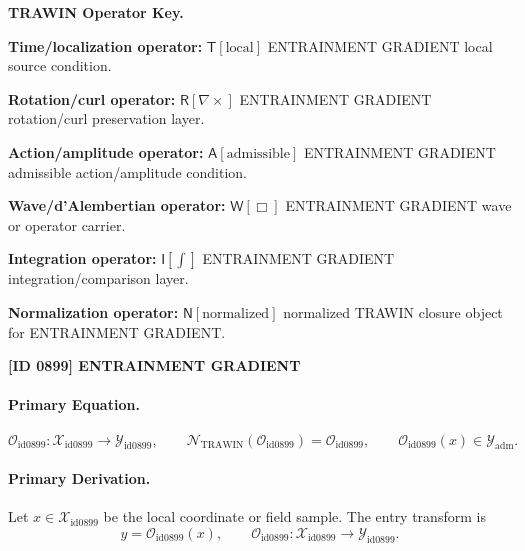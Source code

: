 \par\vspace{0.45\baselineskip}
\noindent\begin{minipage}[t]{\linewidth}
\begingroup
\small
\raggedright
\textbf{TRAWIN Operator Key.}\par
\noindent\textbf{Time/localization operator:} $\mathsf{T}\!\left[\mathrm{local}\right]$ ENTRAINMENT GRADIENT local source condition.\par
\noindent\textbf{Rotation/curl operator:} $\mathsf{R}\!\left[\nabla\times\right]$ ENTRAINMENT GRADIENT rotation/curl preservation layer.\par
\noindent\textbf{Action/amplitude operator:} $\mathsf{A}\!\left[\mathrm{admissible}\right]$ ENTRAINMENT GRADIENT admissible action/amplitude condition.\par
\noindent\textbf{Wave/d'Alembertian operator:} $\mathsf{W}\!\left[\Box\right]$ ENTRAINMENT GRADIENT wave or operator carrier.\par
\noindent\textbf{Integration operator:} $\mathsf{I}\!\left[\int\right]$ ENTRAINMENT GRADIENT integration/comparison layer.\par
\noindent\textbf{Normalization operator:} $\mathsf{N}\!\left[\mathrm{normalized}\right]$ normalized TRAWIN closure object for ENTRAINMENT GRADIENT.\par
\endgroup
\end{minipage}

\clearpage
\noindent\textbf{[ID 0899] ENTRAINMENT GRADIENT}\par
\vspace{0.35em}
\paragraph{Primary Equation.}
\[
\mathcal{O}_{\mathrm{id0899}}:\mathcal{X}_{\mathrm{id0899}}\longrightarrow \mathcal{Y}_{\mathrm{id0899}},\qquad
\mathcal{N}_{\mathrm{TRAWIN}}(\mathcal{O}_{\mathrm{id0899}})=\mathcal{O}_{\mathrm{id0899}},\qquad
\mathcal{O}_{\mathrm{id0899}}(x)\in\mathcal{Y}_{\mathrm{adm}}.
\]

\paragraph{Primary Derivation.} Let $x\in \mathcal{X}_{\mathrm{id0899}}$ be the local coordinate or field sample.  The entry transform is\[
y=\mathcal{O}_{\mathrm{id0899}}(x),\qquad \mathcal{O}_{\mathrm{id0899}}:\mathcal{X}_{\mathrm{id0899}}\longrightarrow \mathcal{Y}_{\mathrm{id0899}}.
\]

